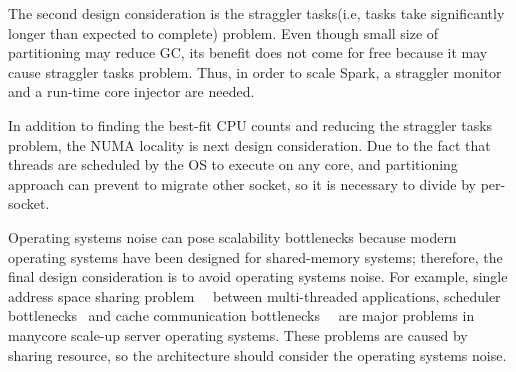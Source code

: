 
The second design consideration is the straggler tasks(i.e, tasks take
significantly longer than expected to complete) problem.
Even though small size of partitioning may reduce GC,
its benefit does not come for free because it may cause straggler tasks
problem.
Thus, in order to scale Spark, a straggler monitor and a run-time core injector are needed.

In addition to finding the best-fit CPU counts and reducing the straggler tasks problem, 
the NUMA locality is next design consideration.
Due to the fact that threads are scheduled by the OS to execute on any core, and 
partitioning approach can prevent to migrate other socket, so it is necessary to 
divide by per-socket.


Operating systems noise can pose scalability
bottlenecks because modern operating systems have been designed for shared-memory
systems; therefore, the final design consideration is to avoid operating systems
noise.
For example, single address space sharing
problem~\cite{AustinTClements2012RCUBalancedTrees}~\cite{Clements2013RadixVM}
between multi-threaded applications, scheduler bottlenecks~\cite{Lozi2016LSD}
and cache communication
bottlenecks~\cite{SilasBoydWickizerPth}~\cite{Hendler2010FC} are major problems
in manycore scale-up server operating systems.
These problems are caused by sharing resource, so the architecture should consider 
the operating systems noise.


